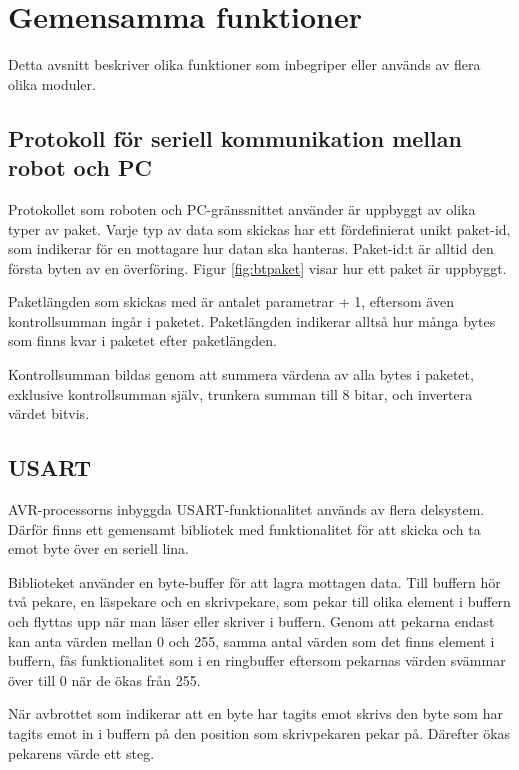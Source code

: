 \section{Gemensamma funktioner}
Detta avsnitt beskriver olika funktioner som inbegriper eller används av flera olika moduler.

\subsection{Protokoll för seriell kommunikation mellan robot och PC}
\label{sec:bt-protokoll}
Protokollet som roboten och PC-gränssnittet använder är uppbyggt av olika typer av paket. Varje typ av data som skickas har ett fördefinierat unikt paket-id, som indikerar för en mottagare hur datan ska hanteras. Paket-id:t är alltid den första byten av en överföring. Figur \ref{fig:btpaket} visar hur ett paket är uppbyggt.


Paketlängden som skickas med är antalet parametrar + 1, eftersom även kontrollsumman ingår i paketet. Paketlängden indikerar alltså hur många bytes som finns kvar i paketet efter paketlängden.

Kontrollsumman bildas genom att summera värdena av alla bytes i paketet, exklusive kontrollsumman själv, trunkera summan till 8 bitar, och invertera värdet bitvis.

\subsection{USART}
\label{sec:usart}
AVR-processorns inbyggda USART-funktionalitet används av flera delsystem. Därför finns ett gemensamt bibliotek med funktionalitet för att skicka och ta emot byte över en seriell lina.

Biblioteket använder en byte-buffer för att lagra mottagen data. Till buffern hör två pekare, en läspekare och en skrivpekare, som pekar till olika element i buffern och flyttas upp när man läser eller skriver i buffern. Genom att pekarna endast kan anta värden mellan 0 och 255, samma antal värden som det finns element i buffern, fås funktionalitet som i en ringbuffer eftersom pekarnas värden svämmar över till 0 när de ökas från 255.

När avbrottet som indikerar att en byte har tagits emot skrivs den byte som har tagits emot in i buffern på den position som skrivpekaren pekar på. Därefter ökas pekarens värde ett steg.

